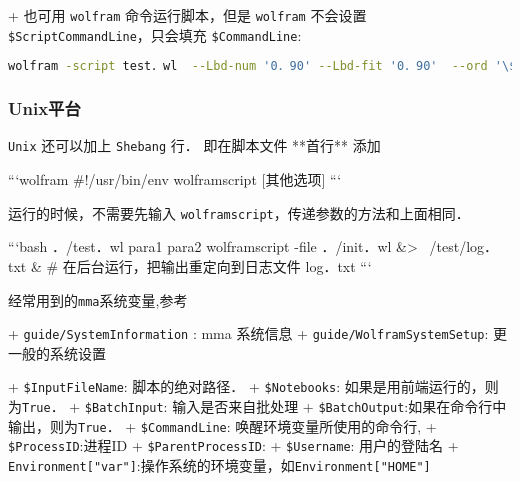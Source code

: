 + 也可用 \verb`wolfram` 命令运行脚本，但是 \verb`wolfram` 不会设置 \verb`$ScriptCommandLine`，只会填充 \verb`$CommandLine`:

\begin{lstlisting}[language=bash]
wolfram -script test．wl  --Lbd-num '0．90' --Lbd-fit '0．90'  --ord '\$ord0'
\end{lstlisting}

\subsubsection{Unix平台} 

\verb`Unix` 还可以加上 \verb`Shebang` 行． 即在脚本文件 **首行** 添加

```wolfram
#!/usr/bin/env wolframscript [其他选项]
```

运行的时候，不需要先输入 \verb`wolframscript`，传递参数的方法和上面相同．

```bash
．/test．wl para1 para2
wolframscript -file ．/init．wl &> ~/test/log．txt & # 在后台运行，把输出重定向到日志文件 log．txt
```

经常用到的\verb`mma`系统变量,参考

+ \verb`guide/SystemInformation` : mma 系统信息
+ \verb`guide/WolframSystemSetup`: 更一般的系统设置

+ \verb`$InputFileName`: 脚本的绝对路径．
+ \verb`$Notebooks`: 如果是用前端运行的，则为\verb`True`．
+ \verb`$BatchInput`: 输入是否来自批处理
+ \verb`$BatchOutput`:如果在命令行中输出，则为\verb`True`．
+ \verb`$CommandLine`: 唤醒环境变量所使用的命令行,
+ \verb`$ProcessID`:进程ID
+ \verb`$ParentProcessID`:
+ \verb`$Username`: 用户的登陆名
+ \verb`Environment["var"]`:操作系统的环境变量，如\verb`Environment["HOME"]`